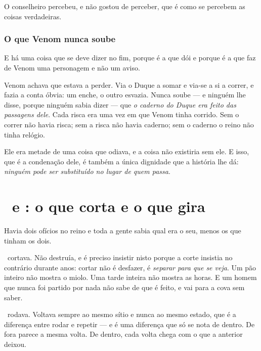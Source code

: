 \documentclass[livro.tex]{subfiles}
\begin{document}
\medskip

O conselheiro percebeu, e não gostou de perceber, que é como se percebem as coisas verdadeiras.

\subsection*{O que Venom nunca soube}

E há uma coisa que se deve dizer no fim, porque é a que dói e porque é a que faz de Venom uma
personagem e não um aviso.

\medskip

Venom achava que estava a perder. Via o Duque a somar e via-se a si a correr, e fazia a conta
óbvia: um enche, o outro esvazia. Nunca soube --- e ninguém lhe disse, porque ninguém sabia dizer
--- que \emph{o caderno do Duque era feito das passagens dele}. Cada risca era uma vez em que
Venom tinha corrido. Sem o correr não havia risca; sem a risca não havia caderno; sem o caderno o
reino não tinha relógio.

\medskip

Ele era metade de uma coisa que odiava, e a coisa não existiria sem ele. E isso, que é a
condenação dele, é também a única dignidade que a história lhe dá: \emph{ninguém pode ser
substituído no lugar de quem passa}.



\chapter{\Drk\ e \Ben: o que corta e o que gira}

Havia dois ofícios no reino e toda a gente sabia qual era o seu, menos os que tinham os dois.

\medskip

\Drk\ cortava. Não destruía, e é preciso insistir nisto porque a corte insistia no contrário
durante anos: cortar não é desfazer, é \emph{separar para que se veja}. Um pão inteiro não mostra
o miolo. Uma tarde inteira não mostra as horas. E um homem que nunca foi partido por nada não sabe
de que é feito, e vai para a cova sem saber.

\medskip

\Ben\ rodava. Voltava sempre ao mesmo sítio e nunca ao mesmo estado, que é a diferença entre rodar
e repetir --- e é uma diferença que só se nota de dentro. De fora parece a mesma volta. De dentro,
cada volta chega com o que a anterior deixou.
\end{document}

